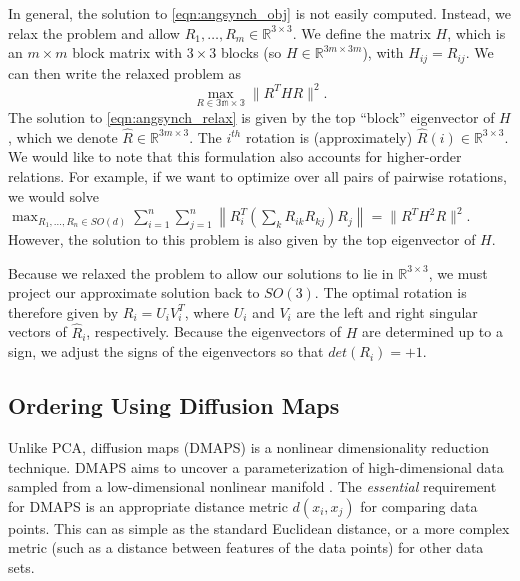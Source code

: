 \documentclass[12pt]{article}
\begin{document}
In general, the solution to \eqref{eqn:angsynch_obj} is not easily computed.
%
Instead, we relax the problem and allow $R_1, \dots, R_m \in \mathbb{R}^{3 \times 3}$.
%
We define the matrix $H$, which is an $m \times m$ block matrix with $3 \times 3$ blocks (so $H \in \mathbb{R}^{3m \times 3m}$), with $H_{ij} = R_{ij}$.
%
We can then write the relaxed problem as 
\begin{equation} \label{eqn:angsynch_relax}
\max_{R\in \mathbb{3m \times 3}} \| R^T H R \|^2.
\end{equation}
%
The solution to \eqref{eqn:angsynch_relax} is given by the top ``block'' eigenvector of $H$, which we denote $\hat{R} \in \mathbb{R}^{3m \times 3}$. 
%
The $i^{th}$ rotation is (approximately) $\hat{R}(i) \in \mathbb{R}^{3 \times 3}$.
%
We would like to note that this formulation also accounts for higher-order relations.
%
For example, if we want to optimize over all pairs of pairwise rotations, we would solve $\max_{R_1, \dots, R_n \in SO(d)} \sum_{i=1}^{n} \sum_{j=1}^{n} \left\| R_i^T \left( \sum_k R_{ik} R_{kj} \right) R_j \right\| = \| R^T H^2 R \|^2$. 
%
However, the solution to this problem is also given by the top eigenvector of $H$. 

Because we relaxed the problem to allow our solutions to lie in $\mathbb{R}^{3 \times 3}$, we must project our approximate solution back to $SO(3)$.
%
The optimal rotation is therefore given by $R_i = U_i V_i^T$, where $U_i$ and $V_i$ are the left and right singular vectors of $\hat{R}_i$, respectively. 
%
Because the eigenvectors of $H$ are determined up to a sign, we adjust the signs of the eigenvectors so that $det(R_i) = +1$. 

\subsection{Ordering Using Diffusion Maps}

Unlike PCA, diffusion maps (DMAPS) is a nonlinear dimensionality reduction technique. 
%
DMAPS aims to uncover a parameterization of high-dimensional data sampled from a low-dimensional nonlinear manifold \cite{coifman2005geometric}.
%
The {\em essential} requirement for DMAPS is an appropriate distance metric $d(x_i, x_j)$ for comparing data points. 
%
This can as simple as the standard Euclidean distance, or a more complex metric (such as a distance between features of the data points) for other data sets.
\end{document}
